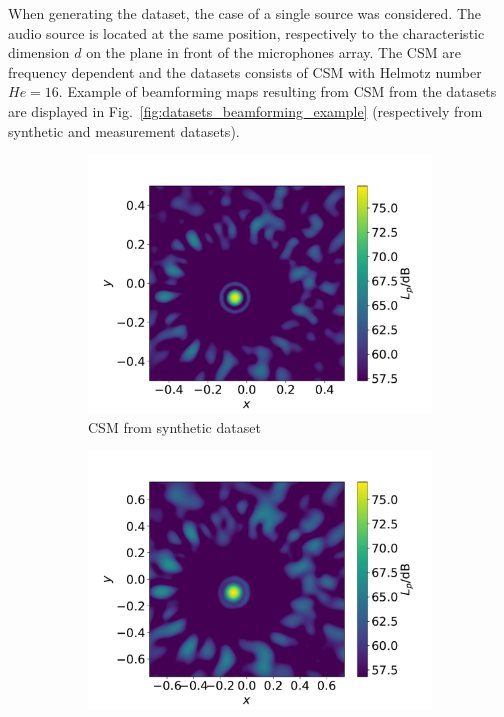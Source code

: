\documentclass[11pt,a4paper,twoside]{report}
\begin{document}
When generating the dataset, the case of a single source was considered. The audio source is located at the same position, respectively to the characteristic dimension $d$ on the plane in front of the microphones array. The CSM are frequency dependent and the datasets consists of CSM with Helmotz number $He = 16$. Example of beamforming maps resulting from CSM from the datasets are displayed in Fig.~\ref{fig:datasets_beamforming_example} (respectively from synthetic and measurement datasets).


\begin{figure}
    \centering
    \begin{subfigure}{0.45\textwidth}
        \centering
        \includegraphics[width=1.3\textwidth]{figs/datasets_beamforming_example_synthetic.pdf}
        \caption{CSM from synthetic dataset}
        \label{fig:datasets_beamforming_example_synthetic}
    \end{subfigure}
    \hfill
    \begin{subfigure}{0.45\textwidth}
        \centering
        \includegraphics[width=1.3\textwidth]{figs/datasets_beamforming_example_measurement.pdf}

\end{subfigure}
\end{figure}
\end{document}

